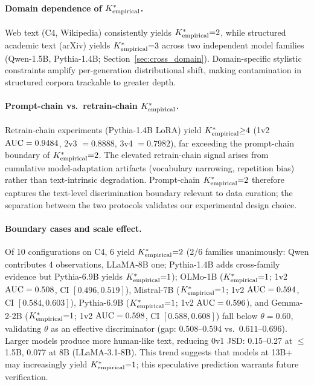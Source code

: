 \paragraph{Domain dependence of ${K^*_{\text{empirical}}}$.}
Web text (C4, Wikipedia) consistently yields ${K^*_{\text{empirical}}}{=}2$, while structured academic text (arXiv) yields ${K^*_{\text{empirical}}}{=}3$ across two independent model families (Qwen-1.5B, Pythia-1.4B; Section~\ref{sec:cross_domain}).
Domain-specific stylistic constraints amplify per-generation distributional shift, making contamination in structured corpora trackable to greater depth.

\paragraph{Prompt-chain vs.\ retrain-chain ${K^*_{\text{empirical}}}$.}
Retrain-chain experiments (Pythia-1.4B LoRA) yield ${K^*_{\text{empirical}}}{\geq}4$ (1v2 $\text{AUC} = 0.9484$, 2v3 $= 0.8888$, 3v4 $= 0.7982$), far exceeding the prompt-chain boundary of ${K^*_{\text{empirical}}}{=}2$.
The elevated retrain-chain signal arises from cumulative model-adaptation artifacts (vocabulary narrowing, repetition bias) rather than text-intrinsic degradation.
Prompt-chain ${K^*_{\text{empirical}}}{=}2$ therefore captures the text-level discrimination boundary relevant to data curation; the separation between the two protocols validates our experimental design choice.

\paragraph{Boundary cases and scale effect.}
Of 10 configurations on C4, 6 yield ${K^*_{\text{empirical}}}{=}2$ (2/6 families unanimously: Qwen contributes 4 observations, LLaMA-8B one; Pythia-1.4B adds cross-family evidence but Pythia-6.9B yields ${K^*_{\text{empirical}}}{=}1$); OLMo-1B (${K^*_{\text{empirical}}}{=}1$; 1v2 $\text{AUC} = 0.508$, CI $[0.496, 0.519]$), Mistral-7B (${K^*_{\text{empirical}}}{=}1$; 1v2 $\text{AUC} = 0.594$, CI $[0.584, 0.603]$), Pythia-6.9B (${K^*_{\text{empirical}}}{=}1$; 1v2 $\text{AUC} = 0.596$), and Gemma-2-2B (${K^*_{\text{empirical}}}{=}1$; 1v2 $\text{AUC} = 0.598$, CI $[0.588, 0.608]$) fall below $\theta{=}0.60$, validating $\theta$ as an effective discriminator (gap: $0.508$--$0.594$ vs.\ $0.611$--$0.696$).
Larger models produce more human-like text, reducing 0v1 JSD: 0.15--0.27 at $\leq$1.5B, 0.077 at 8B (LLaMA-3.1-8B).
This trend suggests that models at 13B+ may increasingly yield ${K^*_{\text{empirical}}}{=}1$; this speculative prediction warrants future verification.

